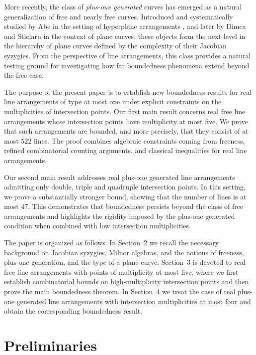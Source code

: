 \documentclass[11pt]{article}
\theoremstyle{plain}
\theoremstyle{definition}
\theoremstyle{remark}
\begin{document}
More recently, the class of \emph{plus-one generated} curves has emerged as a natural
generalization of free and nearly free curves. Introduced and systematically studied by Abe in the setting of hyperplane arrangements \cite{Abe18}, and later by Dimca and Sticlaru \cite{DS20} in the context of plane curves, these objects form the next level in the hierarchy of plane curves defined by the complexity of their Jacobian syzygies. From the perspective of line arrangements, this class provides a natural testing ground for investigating how far boundedness phenomena extend beyond the free case.

The purpose of the present paper is to establish new boundedness results for real line
arrangements of type at most one under explicit constraints on the multiplicities of intersection
points. Our first main result concerns real free line arrangements whose intersection points have
multiplicity at most five. We prove that such arrangements are bounded, and more precisely, that
they consist of at most $522$ lines. The proof combines algebraic constraints coming from
freeness, refined combinatorial counting arguments, and classical inequalities for real line
arrangements.

Our second main result addresses real plus-one generated line arrangements admitting only double,
triple and quadruple intersection points. In this setting, we prove a substantially stronger
bound, showing that the number of lines is at most $47$. This demonstrates that boundedness
persists beyond the class of free arrangements and highlights the rigidity imposed by the
plus-one generated condition when combined with low intersection multiplicities.

The paper is organized as follows. In Section~2 we recall the necessary background on Jacobian
syzygies, Milnor algebras, and the notions of freeness, plus-one generation, and the type of a
plane curve. Section~3 is devoted to real free line arrangements with points of multiplicity at
most five, where we first establish combinatorial bounds on high-multiplicity intersection
points and then prove the main boundedness theorem. In Section~4 we treat the case of real
plus-one generated line arrangements with intersection multiplicities at most four and obtain
the corresponding boundedness result. 
\section{Preliminaries}
\end{document}
